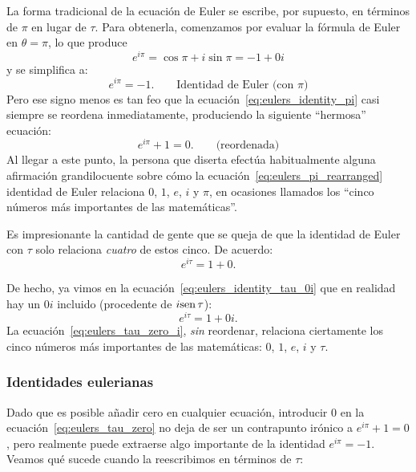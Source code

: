 La forma tradicional de la ecuación de Euler se escribe, por supuesto, en términos de $\pi$ en lugar de $\tau$. Para obtenerla, comenzamos por evaluar la fórmula de Euler en $\theta = \pi$, lo que produce
\begin{equation}
\label{eq:eulers_identity_pi_unsimplified}
e^{i\pi} = \cos \pi + i \sin \pi = -1 + 0i
\end{equation}
y se simplifica a:
\begin{equation}
\label{eq:eulers_identity_pi}
e^{i\pi} = -1. \qquad\mbox{Identidad de Euler (con $\pi$)}
\end{equation}
Pero ese signo menos es tan feo que la ecuación~\eqref{eq:eulers_identity_pi} casi siempre se reordena inmediatamente, produciendo la siguiente ``hermosa'' ecuación:
\begin{equation}
\label{eq:eulers_pi_rearranged}
e^{i\pi} + 1 = 0. \qquad\mbox{(reordenada)}
\end{equation}
Al llegar a este punto, la persona que diserta efectúa habitualmente alguna afirmación grandilocuente sobre cómo la ecuación~\eqref{eq:eulers_pi_rearranged} identidad de Euler relaciona $0$, $1$, $e$, $i$ y $\pi$, en ocasiones llamados los ``cinco números más importantes de las matemáticas''. 

Es impresionante la cantidad de gente que se queja de que la identidad de Euler con $\tau$ solo relaciona \emph{cuatro} de estos cinco. De acuerdo:
\begin{equation} 
  \label{eq:eulers_tau_zero}
e^{i\tau} = 1 + 0.
\end{equation}

De hecho, ya vimos en la ecuación~\eqref{eq:eulers_identity_tau_0i} que en realidad hay un $0i$ incluido (procedente de $i \mbox{sen}\,\tau$):
\begin{equation}
\label{eq:eulers_tau_zero_i}
e^{i\tau} = 1 + 0i.
\end{equation}
La ecuación~\eqref{eq:eulers_tau_zero_i}, \emph{sin} reordenar, relaciona ciertamente los cinco números más importantes de las matemáticas: $0$, $1$, $e$, $i$ y $\tau$.

      \subsubsection{Identidades eulerianas} %
      \label{sec:eulerian_identities}

Dado que es posible añadir cero en cualquier ecuación, introducir $0$ en la ecuación~\eqref{eq:eulers_tau_zero} no deja de ser un contrapunto irónico a $e^{i\pi} + 1 = 0$, pero realmente puede extraerse algo importante de la identidad $e^{i\pi} = -1$. Veamos qué sucede cuando la reescribimos en términos de $\tau$:

